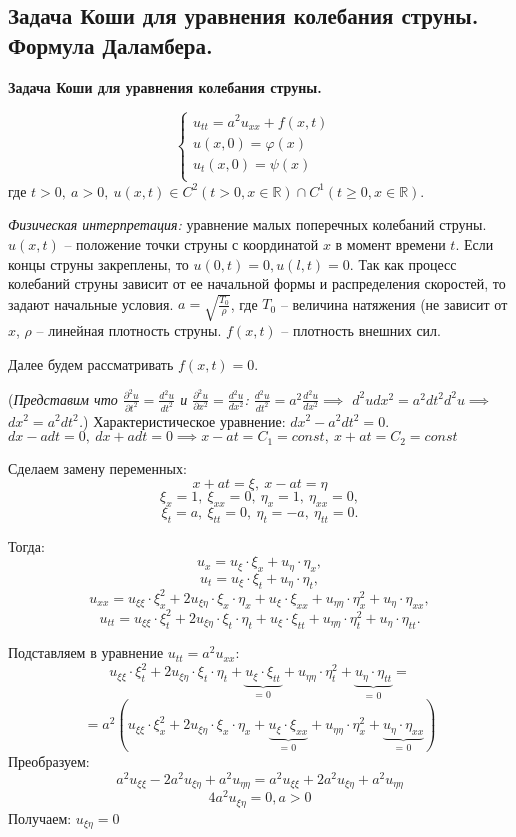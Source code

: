 \subsection{Задача Коши для уравнения колебания струны. Формула Даламбера.}

\textbf{Задача Коши для уравнения колебания струны.}

$$\begin{cases}
u_{tt}=a^2u_{xx}+f(x,t)&\\
u(x,0)=\varphi(x)&\\
u_t(x,0)=\psi(x)&\\
\end{cases}$$ где $t>0,~a>0,~u(x,t)\in C^2(t > 0, x\in \mathbb{R})\cap C^1(t \geqslant 0, x\in \mathbb{R})$.

\bigbreak
\textit{Физическая интерпретация:} уравнение малых поперечных колебаний струны. $u(x,t)$ -- положение точки струны с координатой $x$ в момент времени $t$. Если концы струны закреплены, то $u(0,t)=0, u(l,t)=0$. Так как процесс колебаний струны зависит от ее начальной формы и распределения скоростей, то задают начальные условия. $a = \sqrt{\frac{T_0}{\rho}}$, где $T_0$ -- величина натяжения (не зависит от $x$, $\rho$ -- линейная плотность струны. $f(x,t)$ -- плотность внешних сил.

\bigbreak
Далее будем рассматривать $f(x,t) = 0$.
\bigbreak

(\textit{Представим что $\frac{\partial^2u}{\partial t^2} = \frac{d^2u}{dt^2}$ и $\frac{\partial^2u}{\partial x^2} = \frac{d^2u}{dx^2}$:
$\frac{d^2u}{dt^2} = a^2\frac{d^2u}{dx^2} \implies$
${d^2udx^2 = a^2dt^2d^2u} \implies$
${dx^2 = a^2dt^2}$.})
Характеристическое уравнение: $dx^2-a^2dt^2=0$. \\
$dx - adt=0, ~ dx+adt = 0 \implies x-at=C_1 = const, ~ x+at=C_2 = const$

Сделаем замену переменных: $$x+at=\xi,~x-at=\eta$$
$$\xi_x=1, ~ \xi_{xx}=0, ~ \eta_x = 1,  ~ \eta_{xx} = 0,$$
$$\xi_t=a, ~ \xi_{tt}=0, ~ \eta_t = -a, ~ \eta_{tt} = 0.$$

Тогда:
$$u_x=u_{\xi}\cdot\xi_x+u_{\eta}\cdot\eta_x,$$
$$u_t=u_{\xi}\cdot\xi_t+u_{\eta}\cdot\eta_t,$$
$$u_{xx}=u_{\xi\xi}\cdot\xi_x^2+2u_{\xi\eta}\cdot\xi_x\cdot\eta_x+u_{\xi}\cdot\xi_{xx}+u_{\eta\eta}\cdot\eta_x^2+u_{\eta}\cdot\eta_{xx},$$
$$u_{tt}=u_{\xi\xi}\cdot\xi_t^2+2u_{\xi\eta}\cdot\xi_t\cdot\eta_t+u_{\xi}\cdot\xi_{tt}+u_{\eta\eta}\cdot\eta_t^2+u_{\eta}\cdot\eta_{tt}.$$

Подставляем в уравнение $u_{tt}=a^2u_{xx}$:
$$u_{\xi\xi}\cdot\xi_t^2+2u_{\xi\eta}\cdot\xi_t\cdot\eta_t+\displaystyle\underbrace{u_{\xi}\cdot\xi_{tt}}_{\text{= 0}}+u_{\eta\eta}\cdot\eta_t^2+\displaystyle\underbrace{u_{\eta}\cdot\eta_{tt}}_{\text{= 0}}=$$ $$=a^2(u_{\xi\xi}\cdot\xi_x^2+2u_{\xi\eta}\cdot\xi_x\cdot\eta_x+\displaystyle\underbrace{u_{\xi}\cdot\xi_{xx}}_{\text{= 0}}+u_{\eta\eta}\cdot\eta_x^2+\displaystyle\underbrace{u_{\eta}\cdot\eta_{xx}}_{\text{= 0}})$$
Преобразуем:
$$a^2u_{\xi\xi}-2a^2u_{\xi\eta}+a^2u_{\eta\eta}=a^2u_{\xi\xi}+2a^2u_{\xi\eta}+a^2u_{\eta\eta}$$
$$4a^2u_{\xi\eta}=0,   a>0$$
Получаем: $u_{\xi\eta}=0$

